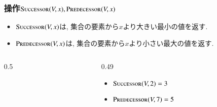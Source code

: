 \documentclass[main]{subfiles}
\begin{document}
\begin{frame}\frametitle{操作$\Successor(V,x), \Predecessor(V,x)$}
\begin{itemize}
	\item $\Successor(V,x)$は, 集合の要素から$x$より大きい最小の値を返す.\\
	\item $\Predecessor(V,x)$は, 集合の要素から$x$より小さい最大の値を返す.\\
\end{itemize}

\begin{columns}[c]
	\begin{column}{0.5\linewidth}
		
	\end{column}
	\begin{column}{0.49\linewidth}
		\begin{itemize}
			\item $\Successor(V,2) = 3$\\
			\item $\Predecessor(V,7) = 5$\\
		\end{itemize}
	\end{column}
\end{columns}
\end{frame}
\end{document}
